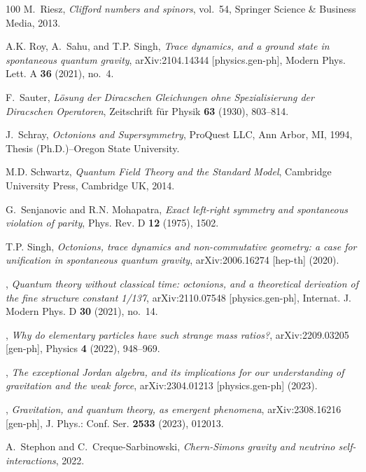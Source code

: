 \documentclass[reqno,11pt]{amsart}
\numberwithin{equation}{section}
\newcommand{\1}{\mbox{\rm 1 \hspace{-1.05 em} 1}}
\begin{document}
{\begin{thebibliography}{100}
M.~Riesz, \emph{Clifford numbers and spinors}, vol.~54, Springer Science \&
  Business Media, 2013.

A.K. Roy, A.~Sahu, and T.P. Singh, \emph{Trace dynamics, and a ground state in
  spontaneous quantum gravity}, arXiv:2104.14344 [physics.gen-ph], Modern Phys.
  Lett. A \textbf{36} (2021), no.~4.

F.~Sauter, \emph{{L{\"o}sung der Diracschen Gleichungen ohne Spezialisierung
  der Diracschen Operatoren}}, Zeitschrift f{\"u}r Physik \textbf{63} (1930),
  803--814.

J.~Schray, \emph{Octonions and {S}upersymmetry}, ProQuest LLC, Ann Arbor, MI,
  1994, Thesis (Ph.D.)--Oregon State University.

M.D. Schwartz, \emph{{Quantum Field Theory and the Standard Model}}, Cambridge
  University Press, Cambridge UK, 2014.

G.~Senjanovic and R.N. Mohapatra, \emph{Exact left-right symmetry and
  spontaneous violation of parity}, Phys. Rev. D \textbf{12} (1975), 1502.

T.P. Singh, \emph{Octonions, trace dynamics and non-commutative geometry: a
  case for unification in spontaneous quantum gravity}, arXiv:2006.16274
  [hep-th] (2020).

\bysame, \emph{Quantum theory without classical time: octonions, and a
  theoretical derivation of the fine structure constant 1/137},
  arXiv:2110.07548 [physics.gen-ph], Internat. J. Modern Phys. D \textbf{30}
  (2021), no.~14.

\bysame, \emph{Why do elementary particles have such strange mass ratios?},
  arXiv:2209.03205 [gen-ph], Physics \textbf{4} (2022), 948--969.

\bysame, \emph{The exceptional {J}ordan algebra, and its implications for our
  understanding of gravitation and the weak force}, arXiv:2304.01213
  [physics.gen-ph] (2023).

\bysame, \emph{Gravitation, and quantum theory, as emergent phenomena},
  arXiv:2308.16216 [gen-ph], J. Phys.: Conf. Ser. \textbf{2533} (2023), 012013.

A.~Stephon and C.~Creque-Sarbinowski, \emph{Chern-{S}imons gravity and neutrino
  self-interactions}, 2022.


\end{thebibliography}}
\end{document}
